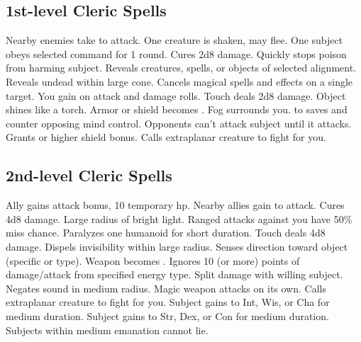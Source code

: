 \subsection{1st-level Cleric Spells}
\begin{spelllist}
   Nearby enemies take  to attack.
   One creature is shaken, may flee.
   One subject obeys selected command for 1 round.
   Cures 2d8 damage.
   Quickly stops poison from harming subject.
   Reveals creatures, spells, or objects of selected alignment.
   Reveals undead within large cone.
   Cancels magical spells and effects on a single target.
   You gain  on attack and damage rolls.
   Touch deals 2d8 damage.
   Object shines like a torch.
   Armor or shield becomes .
   Fog surrounds you.
    to saves and counter opposing mind control.
   Opponents can't attack subject until it attacks.
   Grants  or higher shield bonus.
   Calls extraplanar creature to fight for you.
\end{spelllist}

\subsection{2nd-level Cleric Spells}
\begin{spelllist}
   Ally gains  attack bonus, 10 temporary hp.
   Nearby allies gain  to attack.
   Cures 4d8 damage.
   Large radius of bright light.
   Ranged attacks against you have 50\% miss chance.
   Paralyzes one humanoid for short duration.
   Touch deals 4d8 damage.
   Dispels invisibility within large radius.
   Senses direction toward object (specific or type).
   Weapon becomes .
   Ignores 10 (or more) points of damage/attack from specified energy type.
    Split damage with willing subject.
   Negates sound in medium radius.
   Magic weapon attacks on its own.
   Calls extraplanar creature to fight for you.
   Subject gains  to Int, Wis, or Cha for medium duration.
   Subject gains  to Str, Dex, or Con for medium duration.
   Subjects within medium emanation cannot lie.
\end{spelllist}

